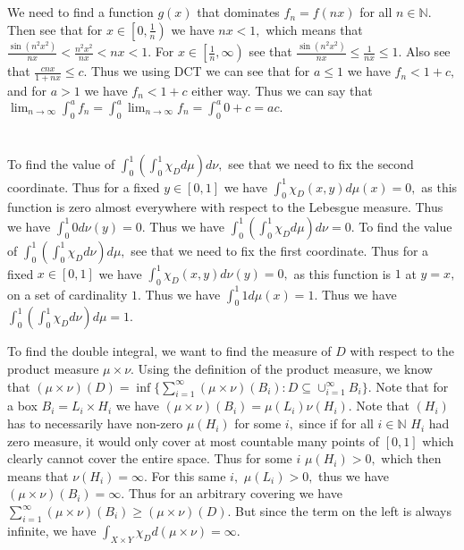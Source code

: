 \documentclass{article}
\begin{document}
\section{} %
We need to find a function $g(x)$ that dominates $f_n=f(nx)$ for all $n \in \mathbb{N}.$ Then see that for $x \in \left[0,\frac{1}{n}\right)$ we have $nx <1,$ which means that $\frac{\sin(n^2x^2)}{nx}< \frac{n^2x^2}{nx} <nx <1.$ For $x \in \left[\frac{1}{n}, \infty \right)$ see that $\frac{\sin(n^2x^2)}{nx} \leq \frac{1}{nx} \leq 1.$   Also see that $\frac{cnx}{1+nx}\leq c.$ Thus we using DCT we can see that for $a \leq 1$ we have $f_n < 1 + c ,$ and for $a > 1$ we have 
$f_n < 1+c$ either way. Thus we can say that $\lim_{n \to \infty} \int_{0}^{a}f_n = \int_{0}^{a}\lim_{n \to \infty}f_n=\int_{0}^{a} 0+c=ac.$ 

\section{} %
To find the value of $\int_{0}^{1} (\int_{0}^{1}\chi_D d\mu)d\nu,$ see that we need to fix the second coordinate. Thus for a fixed $y \in [0,1]$ we have $\int_{0}^{1}\chi_D(x,y)d\mu(x)=0,$ as this function is zero almost everywhere with respect to the Lebesgue measure. Thus we have $\int_{0}^{1}0 d\nu(y)=0.$ Thus we have $\int_{0}^{1} (\int_{0}^{1}\chi_D d\mu)d\nu=0.$
To find the value of $\int_{0}^{1} (\int_{0}^{1}\chi_D d\nu)d\mu,$ see that we need to fix the first coordinate. Thus for a fixed $x \in [0,1]$ we have $\int_{0}^{1}\chi_D(x,y)d\nu(y)=0,$ as this function is $1$ at $y=x,$ on a set of cardinality $1$. Thus we have $\int_{0}^{1}1 d\mu(x)=1.$ Thus we have $\int_{0}^{1} (\int_{0}^{1}\chi_D d\nu)d\mu=1.$ 

To find the double integral, we want to find the measure of $D$ with respect to the product measure $\mu \times \nu.$ Using the definition of the product measure, we know that $(\mu \times \nu)(D)=\inf \{ \sum_{i=1}^{\infty}(\mu \times \nu)(B_i): D \subseteq \cup_{i=1}^{\infty}B_i\}.$ Note that for a box $B_i= L_i \times H_i$ we have $(\mu \times \nu)(B_i)=\mu(L_i)\nu(H_i).$ Note that $(H_i)$ has to necessarily have non-zero $\mu(H_i)$ for some $i,$ since if for all $i \in \mathbb{N}$ $H_i$ had zero measure, it would only cover at most countable many points of $[0,1]$ which clearly cannot cover the entire space. Thus for some $i$ $\mu(H_i)>0,$ which then means that $\nu(H_i)=\infty.$ For this same $i,$ $\mu(L_i)>0,$ thus we have $(\mu \times \nu)(B_i)=\infty.$ Thus for an arbitrary covering we have $\sum_{i=1}^{\infty}(\mu \times \nu)(B_i) \geq (\mu \times \nu)(D).$ But since the term on the left is always infinite, we have $\int_{X \times Y}\chi_D d(\mu \times \nu)=\infty.$   
\end{document}

